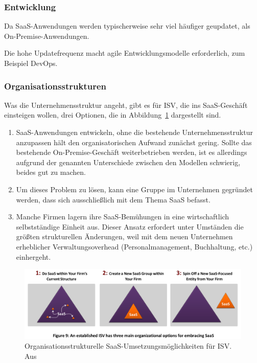 \subsubsection{Entwicklung}
Da SaaS-Anwendungen werden typischerweise sehr viel häufiger geupdatet, als
On-Premise-Anwendungen. 

Die hohe Updatefrequenz macht agile Entwicklungsmodelle erforderlich, zum
Beispiel DevOps. 

\subsubsection{Organisationsstrukturen}
Was die Unternehmensstruktur angeht, gibt es für ISV, die ins SaaS-Geschäft
einsteigen wollen, drei Optionen, die in
Abbildung~\ref{fig:organisationsstrukturen} dargestellt sind.
\begin{enumerate}
	\item SaaS-Anwendungen entwickeln, ohne die bestehende
Unternehmensstruktur anzupassen hält den organisatorischen Aufwand zunächst
gering. Sollte das bestehende On-Premise-Geschäft weiterbetrieben werden, ist
es allerdings aufgrund der genannten Unterschiede zwischen den Modellen
schwierig, beides gut zu machen.
	\item Um dieses Problem zu lösen, kann eine Gruppe im Unternehmen
gegründet werden, dass sich ausschließlich mit dem Thema SaaS befasst.
	\item Manche Firmen lagern ihre SaaS-Bemühungen in eine wirtschaftlich
selbstständige Einheit aus. Dieser Ansatz erfordert unter Umständen die größten
strukturellen Änderungen, weil mit dem neuen Unternehmen erheblicher
Verwaltungsoverhead (Personalmanagement, Buchhaltung, etc.) einhergeht.
\end{enumerate}

\begin{figure}%
\begin{center}
\includegraphics[width=\textwidth]{images/organisationsstrukturen.png}
\caption{Organisationsstrukturelle SaaS-Umsetzungsmöglichkeiten für ISV. Aus
\protect{} }
\label{fig:organisationsstrukturen}
\end{center}
\end{figure}

